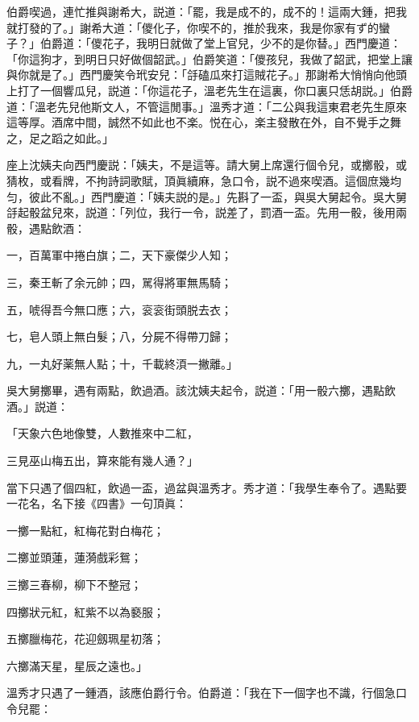 伯爵喫過，連忙推與謝希大，説道：「罷，我是成不的，成不的！這兩大鍾，把我就打發的了。」謝希大道：「儍化子，你喫不的，推於我來，我是你家有ず的蠻子？」伯爵道：「儍花子，我明日就做了堂上官兒，少不的是你替。」西門慶道：「你這狗才，到明日只好做個韶武。」伯爵笑道：「儍孩兒，我做了韶武，把堂上讓與你就是了。」西門慶笑令玳安兒：「㧱磕瓜來打這賊花子。」那謝希大悄悄向他頭上打了一個響瓜兒，説道：「你這花子，溫老先生在這裏，你口裏只恁胡説。」伯爵道：「溫老先兒他斯文人，不管這閒事。」溫秀才道：「二公與我這東君老先生原來這等厚。酒席中間，誠然不如此也不楽。悦在心，楽主發散在外，自不覺手之舞之，足之蹈之如此。」

座上沈姨夫向西門慶説：「姨夫，不是這等。請大舅上席還行個令兒，或擲骰，或猜枚，或看牌，不拘詩詞歌賦，頂眞續麻，急口令，説不過來喫酒。這個庶幾均匀，彼此不亂。」西門慶道：「姨夫説的是。」先斟了一盃，與吳大舅起令。吳大舅㧱起骰盆兒來，説道：「列位，我行一令，説差了，罰酒一盃。先用一骰，後用兩骰，遇點飲酒：

\begin{myquote}
一，百萬軍中捲白旗；二，天下豪傑少人知；

三，秦王斬了余元帥；四，駡得將軍無馬騎；

五，唬得吾今無口應；六，衮衮街頭脱去衣；

七，皂人頭上無白髮；八，分屍不得帶刀歸；

九，一丸好薬無人點；十，千載終湏一撇離。」
\end{myquote}

吳大舅擲畢，遇有兩點，飲過酒。該沈姨夫起令，説道：「用一骰六擲，遇點飲酒。」説道：

\begin{myquote}
「天象六色地像雙，人數推來中二紅，

三見巫山梅五出，算來能有幾人通？」
\end{myquote}

當下只遇了個四紅，飲過一盃，過盆與溫秀才。秀才道：「我學生奉令了。遇點要一花名，名下接《四書》一句頂眞：

\begin{myquote}
一擲一點紅，紅梅花對白梅花；

二擲並頭蓮，蓮漪戲彩鴛；

三擲三春柳，柳下不整冠；

四擲狀元紅，紅紫不以為褻服；

五擲臘梅花，花迎劔珮星初落；

六擲滿天星，星辰之遠也。」
\end{myquote}

溫秀才只遇了一鍾酒，該應伯爵行令。伯爵道：「我在下一個字也不識，行個急口令兒罷：

